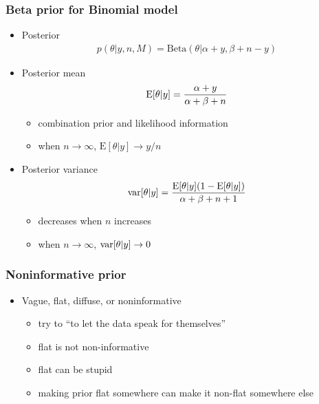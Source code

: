 \documentclass[10pt]{beamer}
\begin{document}
\begin{frame}
  \frametitle{Beta prior for Binomial model}

  \begin{itemize}
  \item Posterior
    \baselineskip
    \begin{align*}
      p(\theta|y,n,M) = \text{Beta}(\theta|\alpha+y,\beta+n-y)
    \end{align*}
    \item Posterior mean
    \baselineskip
    \begin{align*}
      \mathrm{E}[\theta|y] = \frac{\alpha+y}{\alpha+\beta+n}
    \end{align*}
    \begin{itemize}
    \item combination prior and likelihood information
    \item when $n\rightarrow\infty$, $\text{E}[\theta|y]\rightarrow y/n$
    \end{itemize}
    \pause
  \item  Posterior variance
    \baselineskip
    \begin{align*}
      \mathrm{var}[\theta|y]=\frac{\mathrm{E}[\theta|y](1-\mathrm{E}[\theta|y])}{\alpha+\beta+n+1}
    \end{align*}
    \begin{itemize}
    \item decreases when $n$ increases
    \item when $n\rightarrow\infty$, $\mathrm{var}[\theta|y]\rightarrow 0$
    \end{itemize}
  \end{itemize}

\end{frame}

\begin{frame}
\frametitle{Noninformative prior}

\begin{itemize}
  \item Vague, flat, diffuse, or noninformative
  \begin{itemize}
    \item try to ``to let the data speak for themselves''
    \item flat is not non-informative
    \item flat can be stupid
    \item making prior flat somewhere can make it non-flat somewhere
      else
  \end{itemize}
\end{itemize}

\end{frame}
\end{document}
